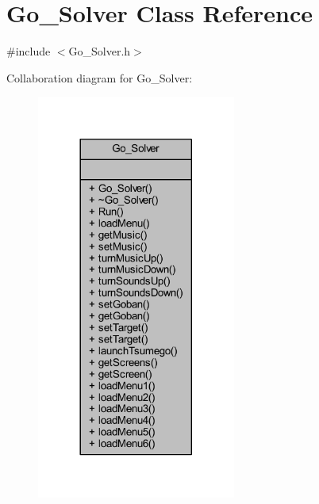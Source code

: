 \hypertarget{class_go___solver}{}\section{Go\+\_\+\+Solver Class Reference}
\label{class_go___solver}


{\ttfamily \#include $<$Go\+\_\+\+Solver.\+h$>$}



Collaboration diagram for Go\+\_\+\+Solver\+:
\nopagebreak
\begin{figure}[H]
\begin{center}
\leavevmode
\includegraphics[width=185pt]{class_go___solver__coll__graph}
\end{center}
\end{figure}
